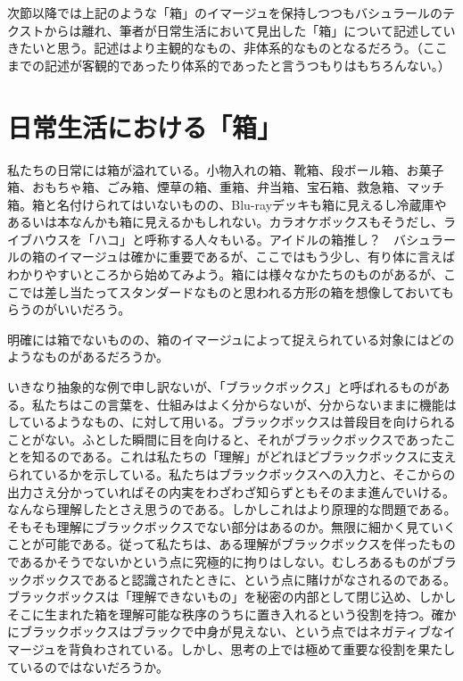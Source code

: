 \documentclass[b5j,twoside,twocolumn]{utarticle}
\begin{document}
次節以降では上記のような「箱」のイマージュを保持しつつもバシュラールのテクストからは離れ、筆者が日常生活において見出した「箱」について記述していきたいと思う。記述はより主観的なもの、非体系的なものとなるだろう。（ここまでの記述が客観的であったり体系的であったと言うつもりはもちろんない。）
\section{日常生活における「箱」}
私たちの日常には箱が溢れている。小物入れの箱、靴箱、段ボール箱、お菓子箱、おもちゃ箱、ごみ箱、煙草の箱、重箱、弁当箱、宝石箱、救急箱、マッチ箱。箱と名付けられてはいないものの、Blu-rayデッキも箱に見えるし冷蔵庫やあるいは本なんかも箱に見えるかもしれない。カラオケボックスもそうだし、ライブハウスを「ハコ」と呼称する人々もいる。アイドルの箱推し？　バシュラールの箱のイマージュは確かに重要であるが、ここではもう少し、有り体に言えばわかりやすいところから始めてみよう。箱には様々なかたちのものがあるが、ここでは差し当たってスタンダードなものと思われる方形の箱を想像しておいてもらうのがいいだろう。


明確には箱でないものの、箱のイマージュによって捉えられている対象にはどのようなものがあるだろうか。


いきなり抽象的な例で申し訳ないが、「ブラックボックス」と呼ばれるものがある。私たちはこの言葉を、仕組みはよく分からないが、分からないままに機能はしているようなもの、に対して用いる。ブラックボックスは普段目を向けられることがない。ふとした瞬間に目を向けると、それがブラックボックスであったことを知るのである。これは私たちの「理解」がどれほどブラックボックスに支えられているかを示している。私たちはブラックボックスへの入力と、そこからの出力さえ分かっていればその内実をわざわざ知らずともそのまま進んでいける。なんなら理解したとさえ思うのである。しかしこれはより原理的な問題である。そもそも理解にブラックボックスでない部分はあるのか。無限に細かく見ていくことが可能である。従って私たちは、ある理解がブラックボックスを伴ったものであるかそうでないかという点に究極的に拘りはしない。むしろあるものがブラックボックスであると認識されたときに、という点に賭けがなされるのである。ブラックボックスは「理解できないもの」を秘密の内部として閉じ込め、しかしそこに生まれた箱を理解可能な秩序のうちに置き入れるという役割を持つ。確かにブラックボックスはブラックで中身が見えない、という点ではネガティブなイマージュを背負わされている。しかし、思考の上では極めて重要な役割を果たしているのではないだろうか。
\end{document}
